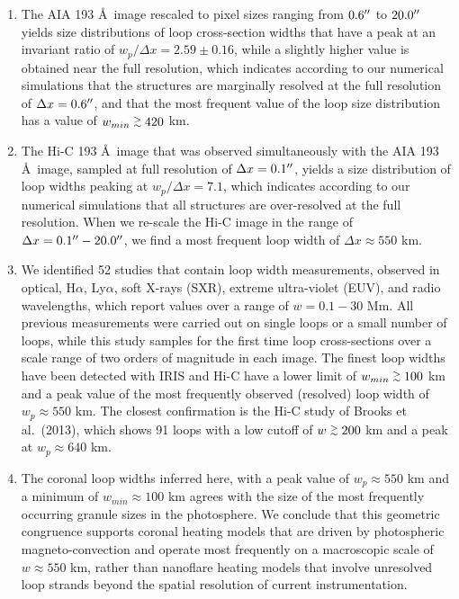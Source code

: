 \documentclass[10pt,preprint]{aastex}  %
\def\ang{\AA}
\def\arcsec{\hbox{$^{\prime\prime}$}}
\def\gapprox{\lower.4ex\hbox{$\;\buildrel >\over{\scriptstyle\sim}\;$}}
\begin{document}
\begin{enumerate}
\item{ 
The AIA 193 \ang\ image 
rescaled to pixel sizes ranging from $0.6\arcsec$ to $20.0\arcsec$ yields
size distributions of loop cross-section widths that have a peak at an
invariant ratio of $w_p/\Delta x = 2.59 \pm 0.16$, while a slightly higher
value is obtained near the full resolution, which indicates according to our 
numerical simulations that the structures are marginally resolved
at the full resolution of $\Delta x = 0.6\arcsec$, and that the most
frequent value of the loop size distribution has a value of
$w_{min} \gapprox 420$ km.}

\item{ The Hi-C 193 \ang\
image that was observed simultaneously with the AIA 193 \ang\ image,
sampled at full resolution of $\Delta x = 0.1\arcsec$, yields a size 
distribution of loop widths peaking at $w_p/\Delta x = 7.1$, which
indicates according to our numerical simulations that all structures
are over-resolved at the full resolution. When we re-scale the Hi-C
image in the range of $\Delta x=0.1\arcsec-20.0\arcsec$, we find a
most frequent loop width of $\Delta x \approx 550$ km.}

\item{ We identified
52 studies that contain loop width measurements, observed in optical,
H$\alpha$, Ly$\alpha$, soft X-rays (SXR), extreme ultra-violet (EUV), 
and radio wavelengths, which report values over a range of $w=0.1-30$ Mm. 
All previous measurements were carried out
on single loops or a small number of loops, while this study samples
for the first time loop cross-sections over a scale range of two 
orders of magnitude in each image. The finest loop widths have been
detected with IRIS and Hi-C have a lower limit of 
$w_{min} \gapprox 100$ km and a peak value of the most frequently
observed (resolved) loop width of $w_p \approx 550$ km. The closest
confirmation is the Hi-C study of Brooks et al.~(2013), which shows
91 loops with a low cutoff of $w \gapprox 200$ km and a peak at
$w_p \approx 640$ km.}

\item{ The coronal
loop widths inferred here, with a peak value of $w_p \approx 550$ km
and a minimum of $w_{min} \approx 100$ km agrees with the size of
the most frequently occurring granule sizes in the photosphere.
We conclude that this geometric congruence supports coronal heating
models that are driven by photospheric magneto-convection and
operate most frequently on a macroscopic scale of $w \approx 550$ km, 
rather than nanoflare heating models that involve unresolved 
loop strands beyond the spatial resolution of current instrumentation.}

\end{enumerate}
\end{document}
